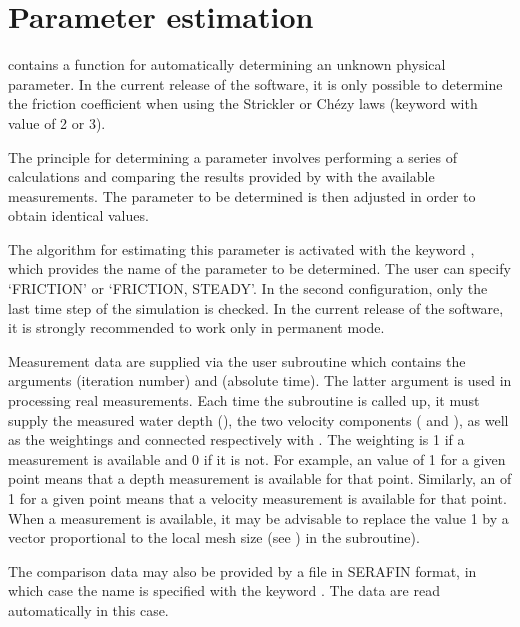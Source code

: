 \section{Parameter estimation}

 contains a function for automatically determining an unknown
physical parameter.
In the current release of the software, it is only possible to determine the
friction coefficient when using the Strickler or Ch\'{e}zy laws (keyword
 with value of 2 or 3).

The principle for determining a parameter involves performing a series of
calculations and comparing the results provided by  with the
available measurements.
The parameter to be determined is then adjusted in order to obtain identical
values.

The algorithm for estimating this parameter is activated with the keyword
, which provides the name of the parameter to be
determined.
The user can specify `FRICTION' or `FRICTION, STEADY'.
In the second configuration, only the last time step of the simulation is
checked.
In the current release of the software, it is strongly recommended to work only
in permanent mode.

Measurement data are supplied via the  user subroutine
which contains the arguments  (iteration number) and 
(absolute time).
The latter argument is used in processing real measurements.
Each time the  subroutine is called up,
it must supply the measured water depth (),
the two velocity components ( and ),
as well as the weightings  and 
connected respectively with .
The weighting is 1 if a measurement is available and 0 if it is not.
For example, an  value of 1 for a given point means
that a depth measurement is available for that point.
Similarly, an  of 1 for a given point means that a velocity
measurement  is available for that point.
When a measurement is available, it may be advisable to replace the value 1
by a vector proportional to the local mesh size
(see ) in the 
subroutine).

The comparison data may also be provided by a file in SERAFIN format,
in which case the name is specified with the keyword .
The data are read automatically in this case.

